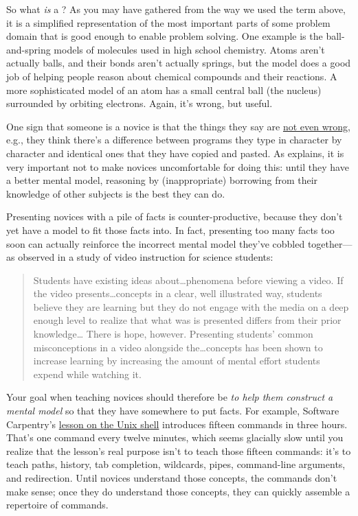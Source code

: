 So what \emph{is} a ? As you
may have gathered from the way we used the term above, it is a
simplified representation of the most important parts of some problem
domain that is good enough to enable problem solving.  One example is
the ball-and-spring models of molecules used in high school chemistry.
Atoms aren't actually balls, and their bonds aren't actually springs,
but the model does a good job of helping people reason about chemical
compounds and their reactions. A more sophisticated model of an atom
has a small central ball (the nucleus) surrounded by orbiting
electrons. Again, it's wrong, but useful.

One sign that someone is a novice is that the things they say are
\href{https://en.wikipedia.org/wiki/Not_even_wrong}{not even wrong},
e.g., they think there's a difference between programs they type in
character by character and identical ones that they have copied and
pasted. As  explains, it is very important not
to make novices uncomfortable for doing this: until they have a better
mental model, reasoning by (inappropriate) borrowing from their
knowledge of other subjects is the best they can do.
  
Presenting novices with a pile of facts is counter-productive, because
they don't yet have a model to fit those facts into.  In fact,
presenting too many facts too soon can actually reinforce the
incorrect mental model they've cobbled together---as \cite{Mull2007a}
observed in a study of video instruction for science students:

\begin{quote}

  Students have existing ideas about{\ldots}phenomena before viewing a
  video. If the video presents{\ldots}concepts in a clear, well
  illustrated way, students believe they are learning but they do not
  engage with the media on a deep enough level to realize that what
  was is presented differs from their prior knowledge{\ldots} There is
  hope, however. Presenting students' common misconceptions in a video
  alongside the{\ldots}concepts has been shown to increase learning by
  increasing the amount of mental effort students expend while
  watching it.

\end{quote}

Your goal when teaching novices should therefore be \emph{to help them
  construct a mental model} so that they have somewhere to put facts.
For example, Software Carpentry's
\href{http://swcarpentry.github.io/shell-novice/}{lesson on the Unix
  shell} introduces fifteen commands in three hours. That's one
command every twelve minutes, which seems glacially slow until you
realize that the lesson's real purpose isn't to teach those fifteen
commands: it's to teach paths, history, tab completion, wildcards,
pipes, command-line arguments, and redirection.  Until novices
understand those concepts, the commands don't make sense; once they do
understand those concepts, they can quickly assemble a repertoire of
commands.

